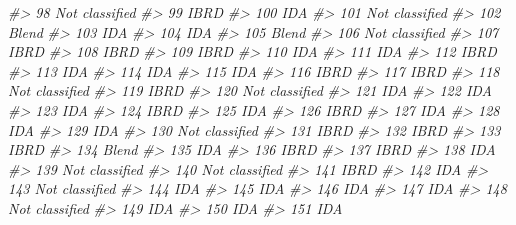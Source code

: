 \documentclass[
  xelatex, ja=standard]{bxjsbook}
\newenvironment{Shaded}{\begin{snugshade}}{\end{snugshade}}
\newcommand{\CommentTok}[1]{\textcolor[rgb]{0.56,0.35,0.01}{\textit{#1}}}
\theoremstyle{definition}
\theoremstyle{definition}
\theoremstyle{definition}
\theoremstyle{definition}
\theoremstyle{remark}
\begin{document}
\begin{Shaded}
\begin{Highlighting}[]
\CommentTok{\#\textgreater{} 98  Not classified}
\CommentTok{\#\textgreater{} 99            IBRD}
\CommentTok{\#\textgreater{} 100            IDA}
\CommentTok{\#\textgreater{} 101 Not classified}
\CommentTok{\#\textgreater{} 102          Blend}
\CommentTok{\#\textgreater{} 103            IDA}
\CommentTok{\#\textgreater{} 104            IDA}
\CommentTok{\#\textgreater{} 105          Blend}
\CommentTok{\#\textgreater{} 106 Not classified}
\CommentTok{\#\textgreater{} 107           IBRD}
\CommentTok{\#\textgreater{} 108           IBRD}
\CommentTok{\#\textgreater{} 109           IBRD}
\CommentTok{\#\textgreater{} 110            IDA}
\CommentTok{\#\textgreater{} 111            IDA}
\CommentTok{\#\textgreater{} 112           IBRD}
\CommentTok{\#\textgreater{} 113            IDA}
\CommentTok{\#\textgreater{} 114            IDA}
\CommentTok{\#\textgreater{} 115            IDA}
\CommentTok{\#\textgreater{} 116           IBRD}
\CommentTok{\#\textgreater{} 117           IBRD}
\CommentTok{\#\textgreater{} 118 Not classified}
\CommentTok{\#\textgreater{} 119           IBRD}
\CommentTok{\#\textgreater{} 120 Not classified}
\CommentTok{\#\textgreater{} 121            IDA}
\CommentTok{\#\textgreater{} 122            IDA}
\CommentTok{\#\textgreater{} 123            IDA}
\CommentTok{\#\textgreater{} 124           IBRD}
\CommentTok{\#\textgreater{} 125            IDA}
\CommentTok{\#\textgreater{} 126           IBRD}
\CommentTok{\#\textgreater{} 127            IDA}
\CommentTok{\#\textgreater{} 128            IDA}
\CommentTok{\#\textgreater{} 129            IDA}
\CommentTok{\#\textgreater{} 130 Not classified}
\CommentTok{\#\textgreater{} 131           IBRD}
\CommentTok{\#\textgreater{} 132           IBRD}
\CommentTok{\#\textgreater{} 133           IBRD}
\CommentTok{\#\textgreater{} 134          Blend}
\CommentTok{\#\textgreater{} 135            IDA}
\CommentTok{\#\textgreater{} 136           IBRD}
\CommentTok{\#\textgreater{} 137           IBRD}
\CommentTok{\#\textgreater{} 138            IDA}
\CommentTok{\#\textgreater{} 139 Not classified}
\CommentTok{\#\textgreater{} 140 Not classified}
\CommentTok{\#\textgreater{} 141           IBRD}
\CommentTok{\#\textgreater{} 142            IDA}
\CommentTok{\#\textgreater{} 143 Not classified}
\CommentTok{\#\textgreater{} 144            IDA}
\CommentTok{\#\textgreater{} 145            IDA}
\CommentTok{\#\textgreater{} 146            IDA}
\CommentTok{\#\textgreater{} 147            IDA}
\CommentTok{\#\textgreater{} 148 Not classified}
\CommentTok{\#\textgreater{} 149            IDA}
\CommentTok{\#\textgreater{} 150            IDA}
\CommentTok{\#\textgreater{} 151            IDA}

\end{Highlighting}
\end{Shaded}
\end{document}
